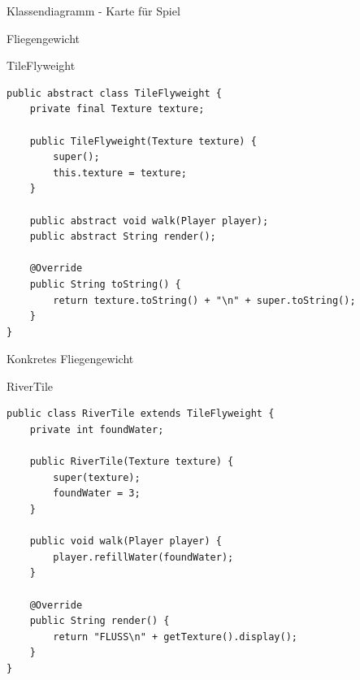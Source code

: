 \begin{frame}{Klassendiagramm - Karte für Spiel}
\end{frame}

\begin{frame}[fragile]{Fliegengewicht}
	\begin{exampleblock}{TileFlyweight}
 		\begin{lstlisting}
public abstract class TileFlyweight {
	private final Texture texture;
	
	public TileFlyweight(Texture texture) {
		super();
		this.texture = texture;
	}

	public abstract void walk(Player player);
	public abstract String render();
	
	@Override
	public String toString() {
		return texture.toString() + "\n" + super.toString();
	}	
}
 		\end{lstlisting}
 	\end{exampleblock}
\end{frame}

\begin{frame}[fragile]{Konkretes Fliegengewicht}
	\begin{exampleblock}{RiverTile}
 		\begin{lstlisting}
public class RiverTile extends TileFlyweight {
	private int foundWater;
	
	public RiverTile(Texture texture) {
		super(texture);
		foundWater = 3;
	}
	
	public void walk(Player player) {
		player.refillWater(foundWater);
	}
	
	@Override
	public String render() {
		return "FLUSS\n" + getTexture().display();
	}
}
 		\end{lstlisting}
 	\end{exampleblock}
\end{frame}

